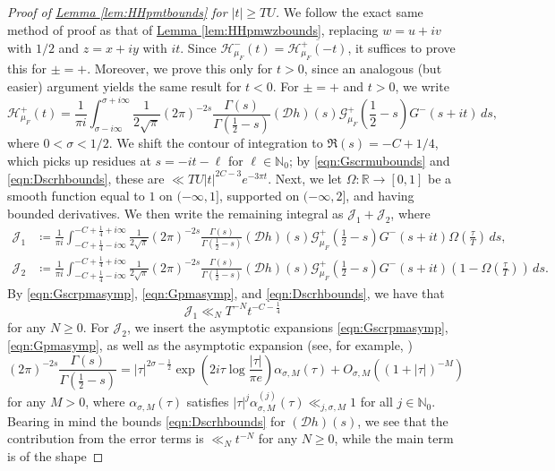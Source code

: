 \documentclass[11pt,a4paper]{amsart}
\newcommand{\Dscr}{\mathscr{D}}
\newcommand{\Gscr}{\mathscr{G}}
\newcommand{\HH}{\mathcal{H}}
\newcommand{\JJ}{\mathcal{J}}
\newcommand{\N}{\mathbb{N}}
\newcommand{\R}{\mathbb{R}}
\numberwithin{equation}{section}
\theoremstyle{remark}
\theoremstyle{definition}
\begin{document}
\begin{proof}[Proof of {\hyperref[lem:HHpmtbounds]{Lemma \ref*{lem:HHpmtbounds}}} for $|t| \geq TU$]
We follow the exact same method of proof as that of \hyperref[lem:HHpmwzbounds]{Lemma \ref*{lem:HHpmwzbounds}}, replacing $w = u + iv$ with $1/2$ and $z = x + iy$ with $it$. Since $\HH_{\mu_F}^{-}(t) = \overline{\HH_{\mu_F}^{+}(-t)}$, it suffices to prove this for $\pm = +$. Moreover, we prove this only for $t > 0$, since an analogous (but easier) argument yields the same result for $t < 0$. For $\pm = +$ and $t > 0$, we write
\[\HH_{\mu_F}^{+}(t) = \frac{1}{\pi i} \int_{\sigma - i\infty}^{\sigma + i\infty} \frac{1}{2\sqrt{\pi}} (2\pi)^{-2s} \frac{\Gamma(s)}{\Gamma\left(\frac{1}{2} - s\right)} (\Dscr h)(s) \Gscr_{\mu_F}^{+}\left(\frac{1}{2} - s\right) G^{-}(s + it) \, ds,\]
where $0 < \sigma < 1/2$. We shift the contour of integration to $\Re(s) = -C + 1/4$, which picks up residues at $s = -it - \ell$ for $\ell \in \N_0$; by \eqref{eqn:Gscrmubounds} and \eqref{eqn:Dscrhbounds}, these are $\ll TU |t|^{2C - 3} e^{-3\pi t}$. Next, we let $\Omega : \R \to [0,1]$ be a smooth function equal to $1$ on $(-\infty,1]$, supported on $(-\infty,2]$, and having bounded derivatives. We then write the remaining integral as $\JJ_1 + \JJ_2$, where
\begin{align*}
\JJ_1 & \coloneqq \frac{1}{\pi i} \int_{-C + \frac{1}{4} - i\infty}^{-C + \frac{1}{4} + i\infty} \frac{1}{2\sqrt{\pi}} (2\pi)^{-2s} \frac{\Gamma(s)}{\Gamma\left(\frac{1}{2} - s\right)} (\Dscr h)(s) \Gscr_{\mu_F}^{+}\left(\frac{1}{2} - s\right) G^{-}(s + it) \Omega\left(\frac{\tau}{T}\right) \, ds,	\\
\JJ_2 & \coloneqq \frac{1}{\pi i} \int_{-C + \frac{1}{4} - i\infty}^{-C + \frac{1}{4} + i\infty} \frac{1}{2\sqrt{\pi}} (2\pi)^{-2s} \frac{\Gamma(s)}{\Gamma\left(\frac{1}{2} - s\right)} (\Dscr h)(s) \Gscr_{\mu_F}^{+}\left(\frac{1}{2} - s\right) G^{-}(s + it) \left(1 - \Omega\left(\frac{\tau}{T}\right)\right) \, ds.
\end{align*}
By \eqref{eqn:Gscrpmasymp}, \eqref{eqn:Gpmasymp}, and \eqref{eqn:Dscrhbounds}, we have that
\[\JJ_1 \ll_N T^{-N} t^{-C - \frac{1}{4}}\]
for any $N \geq 0$. For $\JJ_2$, we insert the asymptotic expansions \eqref{eqn:Gscrpmasymp}, \eqref{eqn:Gpmasymp}, as well as the asymptotic expansion (see, for example, \cite[(2.4)]{BK19})
\[(2\pi)^{-2s} \frac{\Gamma(s)}{\Gamma\left(\frac{1}{2} - s\right)} = |\tau|^{2\sigma - \frac{1}{2}} \exp\left(2i\tau \log \frac{|\tau|}{\pi e}\right) \alpha_{\sigma,M}(\tau) + O_{\sigma,M}((1 + |\tau|)^{-M})\]
for any $M > 0$, where $\alpha_{\sigma,M}(\tau)$ satisfies $|\tau|^j \alpha_{\sigma,M}^{(j)}(\tau) \ll_{j,\sigma,M} 1$ for all $j \in \N_0$. Bearing in mind the bounds \eqref{eqn:Dscrhbounds} for $(\Dscr h)(s)$, we see that the contribution from the error terms is $\ll_N t^{-N}$ for any $N \geq 0$, while the main term is of the shape

\end{proof}
\end{document}
